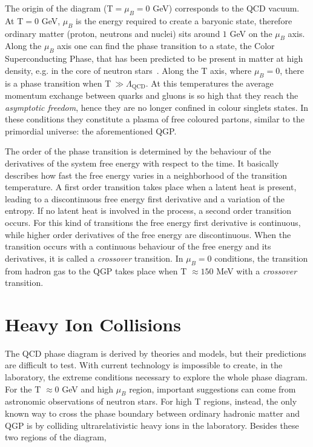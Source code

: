 The origin of the diagram (T$=\mu_{B}=0$ GeV) corresponds to the QCD vacuum. At T$=0$ GeV, $\mu_{B}$ is 
the energy required to create a baryonic state, therefore ordinary matter (proton, neutrons and nuclei)
sits around $1$ GeV on the $\mu_{B}$ axis. Along the $\mu_{B}$ axis one can find the phase transition to a state,
the Color Superconducting Phase, that has been predicted to be present in matter at high density,
e.g. in  the core of neutron stars~\cite{csp}.
Along the T axis, where $\mu_{B}=0$, there is a phase transition when T$\ \gg \Lambda_{\mathrm{QCD}}$. 
At this temperatures the average momentum exchange between quarks and gluons is so high that they reach
the \textit{asymptotic freedom}, hence they are no longer confined in colour singlets states.
In these conditions they constitute a plasma of free coloured partons, similar to the primordial 
universe: the aforementioned QGP.

The order of the phase transition is determined by the behaviour of the derivatives of the system free
energy with respect to the time. It basically describes how fast the free energy varies in a
neighborhood of the transition temperature.
A first order transition takes place when a latent heat is present, leading to a discontinuous free
energy first derivative and a variation of the entropy.
If no latent heat is involved in the process, a second order transition occurs. For this kind of
transitions the free energy first derivative is continuous, while higher order derivatives of the free
energy are discontinuous.
When the transition occurs with a continuous behaviour of the free energy and its derivatives,
it is called a \textit{crossover} transition.
In $\mu_{B}=0$ conditions, the transition from hadron gas to the QGP takes place when T
$\approx 150$ MeV with a \textit{crossover} transition.

%
%
\section{Heavy Ion Collisions}
\label{sec:1.3}

The QCD phase diagram is derived by theories and models, but their predictions are difficult to test.
With current technology is impossible to create, in the laboratory, the extreme conditions necessary
to explore the whole phase diagram.
For the T $\approx0$ GeV and high $\mu_{B}$ region, important suggestions can come from astronomic
observations of neutron stars. 
For high T regions, instead, the only known way to cross the phase boundary between ordinary hadronic
matter and QGP is by colliding ultrarelativistic heavy ions in the laboratory.
Besides these two regions of the diagram,  

